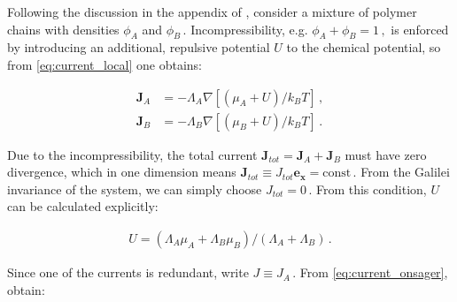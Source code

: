 \documentclass[bachelor,       %
               oneside,        %
               BCOR10mm,       %
               ngerman, english %
               ]{GAUBM}
\begin{document}








Following the discussion in the appendix of \cite{deGennes80}, consider a mixture of polymer chains with densities $\phi_A$ and $\phi_B\,.$ Incompressibility, e.g. $\phi_A+\phi_B=1\,,$ is enforced by introducing an additional, repulsive potential $U$ to the chemical potential, so from \autoref{eq:current_local} one obtains:



\begin{subequations}
  \begin{align}
    \mathbf{J}_A&=-\Lambda_A\nabla [(\mu_A + U)/k_BT]\,,\\
    \mathbf{J}_B&=-\Lambda_B\nabla [(\mu_B + U)/k_BT]\,.
  \end{align}
  \label{eq:current_onsager}
\end{subequations}

Due to the incompressibility, the total current $\mathbf J_{tot}=\mathbf{J}_A+\mathbf{J}_B$ must have zero divergence, which in one dimension means $\mathbf J_{tot}\equiv J_{tot}\mathbf{e_x}=\mathrm{const}\,.$ From the Galilei invariance of the system, we can simply choose $J_{tot}=0\,.$ From this condition, $U$ can be calculated explicitly:

\begin{align}
  U=(\Lambda_A\mu_A+\Lambda_B\mu_B)/(\Lambda_A+\Lambda_B)\,.
\end{align}

Since one of the currents is redundant, write $J\equiv J_A\,.$ From \autoref{eq:current_onsager}, obtain:
\end{document}
